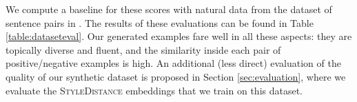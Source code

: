  We compute a baseline for these scores with natural data from the dataset of sentence pairs in \citet{stel}. The results of these evaluations can be found in Table \ref{table:dataseteval}. Our generated examples fare well in all these aspects: they are topically diverse and fluent, and the similarity inside each pair of positive/negative examples is high. An additional (less direct) evaluation of the quality of our synthetic dataset is proposed in Section \ref{sec:evaluation}, where we evaluate the \textsc{StyleDistance} embeddings that we train on this dataset.


\datasetevaltable